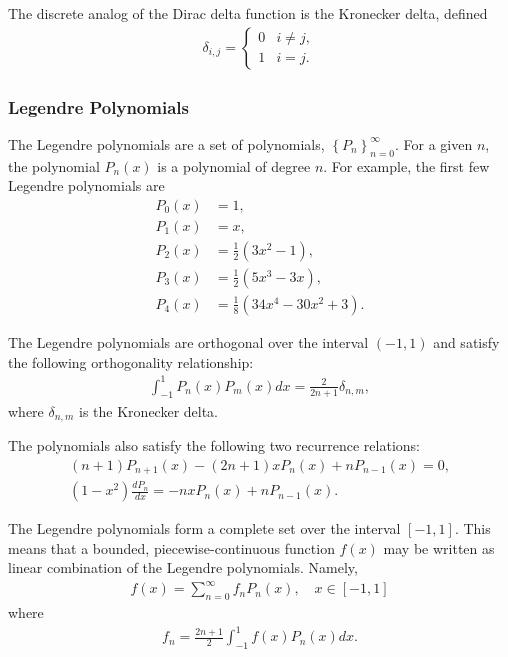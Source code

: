 \documentclass[11pt]{article}
\begin{document}
The discrete analog of the Dirac delta function is the Kronecker delta, defined
\begin{align}
  \delta_{i,j} = 
  \begin{cases}
    0 & i \neq j, \\
    1 & i = j.
  \end{cases}
\end{align}
\subsubsection{Legendre Polynomials}
\label{sec:orgheadline66}
The Legendre polynomials are a set of polynomials, \(\left\{ P_n \right\}_{n=0}^\infty\).  For a given \(n\), the polynomial \(P_n(x)\) is a polynomial of degree \(n\).  For example, the first few Legendre polynomials are
\begin{align*}
  P_0(x) &= 1, \\
  P_1(x) &= x, \\
  P_2(x) &= \frac{1}{2}\left(3 x^2 - 1 \right), \\
  P_3(x) &= \frac{1}{2}\left(5 x^3 - 3 x \right), \\
  P_4(x) &= \frac{1}{8}\left(34 x^4 - 30 x^2 + 3 \right).
\end{align*}

The Legendre polynomials are orthogonal over the interval \((-1, 1)\) and satisfy the following orthogonality relationship:
\begin{align}
  \int_{-1}^1 P_n(x) P_m(x) dx = \frac{2}{2n+1} \delta_{n,m},
\end{align}
where \(\delta_{n,m}\) is the Kronecker delta.

The polynomials also satisfy the following two recurrence relations:
\begin{align}
  (n+1) P_{n+1}(x) - (2n + 1) x P_n(x) + n P_{n-1}(x) = 0, \\
  \left(1 - x^2\right) \frac{dP_n}{dx} = -n x P_n(x) + n P_{n-1}(x).
\end{align}

The Legendre polynomials form a complete set over the interval \([-1, 1]\).  This means that a bounded, piecewise-continuous function \(f(x)\) may be written as linear combination of the Legendre polynomials.  Namely,
\begin{align}
  f(x) = \sum_{n=0}^\infty f_n P_n(x), \quad x \in [-1,1]
\end{align}
where
\begin{align}
  f_n = \frac{2n+1}{2} \int_{-1}^{1} f(x) P_n(x) dx.
\end{align}
\end{document}
